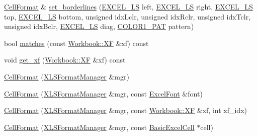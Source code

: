 \begin{DoxyCompactItemize}
\item 
\hyperlink{struct_excel_format_1_1_cell_format}{Cell\+Format} \& \hyperlink{struct_excel_format_1_1_cell_format_a1668bb80540887b923b2aa620fa9067e}{set\+\_\+borderlines} (\hyperlink{namespace_excel_format_af723db0cf2ef2243e273dcf782c51355}{E\+X\+C\+E\+L\+\_\+\+L\+S} left, \hyperlink{namespace_excel_format_af723db0cf2ef2243e273dcf782c51355}{E\+X\+C\+E\+L\+\_\+\+L\+S} right, \hyperlink{namespace_excel_format_af723db0cf2ef2243e273dcf782c51355}{E\+X\+C\+E\+L\+\_\+\+L\+S} top, \hyperlink{namespace_excel_format_af723db0cf2ef2243e273dcf782c51355}{E\+X\+C\+E\+L\+\_\+\+L\+S} bottom, unsigned idx\+Lclr, unsigned idx\+Rclr, unsigned idx\+Tclr, unsigned idx\+Bclr, \hyperlink{namespace_excel_format_af723db0cf2ef2243e273dcf782c51355}{E\+X\+C\+E\+L\+\_\+\+L\+S} diag, \hyperlink{namespace_excel_format_ac32635705247b08ca94547c6d08b9f2f}{C\+O\+L\+O\+R1\+\_\+\+P\+A\+T} pattern)
\item 
bool \hyperlink{struct_excel_format_1_1_cell_format_a89917ae10c082ab984acc51d172620ab}{matches} (const \hyperlink{struct_y_excel_1_1_workbook_1_1_x_f}{Workbook\+::\+X\+F} \&xf) const 
\item 
void \hyperlink{struct_excel_format_1_1_cell_format_ab74018c3f4ff008ad530da7c674d1962}{get\+\_\+xf} (\hyperlink{struct_y_excel_1_1_workbook_1_1_x_f}{Workbook\+::\+X\+F} \&xf) const 
\item 
\hyperlink{struct_excel_format_1_1_cell_format_a78f64bc1a0b7b6f7406e972d3a715bd4}{Cell\+Format} (\hyperlink{struct_excel_format_1_1_x_l_s_format_manager}{X\+L\+S\+Format\+Manager} \&mgr)
\item 
\hyperlink{struct_excel_format_1_1_cell_format_a463a56510f06cd9b73f2bb177f6a15de}{Cell\+Format} (\hyperlink{struct_excel_format_1_1_x_l_s_format_manager}{X\+L\+S\+Format\+Manager} \&mgr, const \hyperlink{struct_excel_format_1_1_excel_font}{Excel\+Font} \&font)
\item 
\hyperlink{struct_excel_format_1_1_cell_format_a1848c9d951e12897bc352a09b8bad804}{Cell\+Format} (\hyperlink{struct_excel_format_1_1_x_l_s_format_manager}{X\+L\+S\+Format\+Manager} \&mgr, const \hyperlink{struct_y_excel_1_1_workbook_1_1_x_f}{Workbook\+::\+X\+F} \&xf, int xf\+\_\+idx)
\item 
\hyperlink{struct_excel_format_1_1_cell_format_adfec20abe07d6a70571bad63d50d46da}{Cell\+Format} (\hyperlink{struct_excel_format_1_1_x_l_s_format_manager}{X\+L\+S\+Format\+Manager} \&mgr, const \hyperlink{class_y_excel_1_1_basic_excel_cell}{Basic\+Excel\+Cell} $\ast$cell)
\item 

\end{DoxyCompactItemize}
